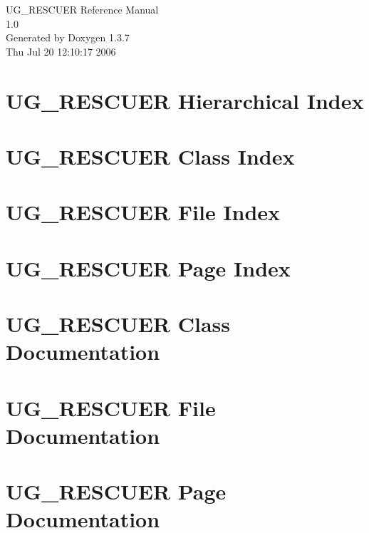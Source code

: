 \documentclass[a4paper]{book}
\begin{document}
\begin{titlepage}
\vspace*{7cm}
\begin{center}
{\Large UG\_\-RESCUER Reference Manual\\[1ex]\large 1.0 }\\
\vspace*{1cm}
{\large Generated by Doxygen 1.3.7}\\
\vspace*{0.5cm}
{\small Thu Jul 20 12:10:17 2006}\\
\end{center}
\end{titlepage}
\clearemptydoublepage
{}
\tableofcontents
\clearemptydoublepage
{}
\chapter{UG\_\-RESCUER Hierarchical Index}

\chapter{UG\_\-RESCUER Class Index}

\chapter{UG\_\-RESCUER File Index}

\chapter{UG\_\-RESCUER Page Index}

\chapter{UG\_\-RESCUER Class Documentation}



\chapter{UG\_\-RESCUER File Documentation}











\chapter{UG\_\-RESCUER Page Documentation}

\printindex
\end{document}
